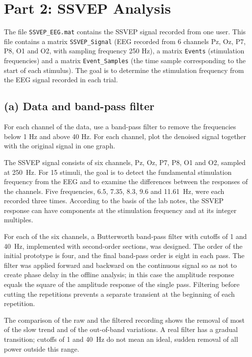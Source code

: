 \section{Part 2: SSVEP Analysis}

\begin{taskbox}
The file \texttt{SSVEP\_EEG.mat} contains the SSVEP signal recorded from one user. This file contains a matrix \texttt{SSVEP\_Signal} (EEG recorded from 6 channels Pz, Oz, P7, P8, O1 and O2, with sampling frequency 250 Hz), a matrix \texttt{Events} (stimulation frequencies) and a matrix \texttt{Event\_Samples} (the time sample corresponding to the start of each stimulus). The goal is to determine the stimulation frequency from the EEG signal recorded in each trial.
\end{taskbox}

\subsection*{(a) Data and band-pass filter}
\begin{taskbox}
For each channel of the data, use a band-pass filter to remove the frequencies below 1 Hz and above 40 Hz. For each channel, plot the denoised signal together with the original signal in one graph.
\end{taskbox}

The SSVEP signal consists of six channels, Pz, Oz, P7, P8, O1 and O2, sampled at 250~Hz. For 15 stimuli, the goal is to detect the fundamental stimulation frequency from the EEG and to examine the differences between the responses of the channels. Five frequencies, 6.5, 7.35, 8.3, 9.6 and 11.61~Hz, were each recorded three times. According to the basis of the lab notes, the SSVEP response can have components at the stimulation frequency and at its integer multiples.

For each of the six channels, a Butterworth band-pass filter with cutoffs of 1 and 40~Hz, implemented with second-order sections, was designed. The order of the initial prototype is four, and the final band-pass order is eight in each pass. The filter was applied forward and backward on the continuous signal so as not to create phase delay in the offline analysis; in this case the amplitude response equals the square of the amplitude response of the single pass. Filtering before cutting the repetitions prevents a separate transient at the beginning of each repetition.

The comparison of the raw and the filtered recording shows the removal of most of the slow trend and of the out-of-band variations. A real filter has a gradual transition; cutoffs of 1 and 40~Hz do not mean an ideal, sudden removal of all power outside this range.

